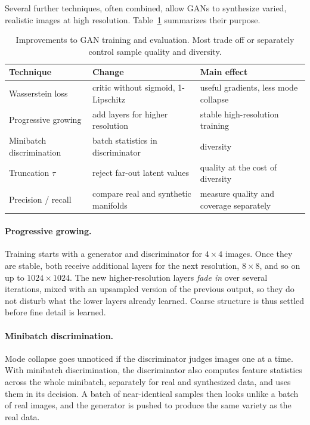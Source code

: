 Several further techniques, often combined, allow GANs to synthesize varied,
realistic images at high resolution.
Table~\ref{tab:gan-improvements} summarizes their purpose.

\begin{table}[ht]
  \centering
  \begin{tabular}{@{}p{4.0cm}p{5.0cm}p{5.0cm}@{}}
    \toprule
    Technique & Change & Main effect \\
    \midrule
    Wasserstein loss & critic without sigmoid, 1-Lipschitz & useful gradients,
      less mode collapse \\
    Progressive growing & add layers for higher resolution & stable
      high-resolution training \\
    Minibatch discrimination & batch statistics in discriminator & diversity \\
    Truncation $\tau$ & reject far-out latent values & quality at the cost of
      diversity \\
    Precision / recall & compare real and synthetic manifolds & measure
      quality and coverage separately \\
    \bottomrule
  \end{tabular}
  \caption{Improvements to GAN training and evaluation. Most trade off or
  separately control sample quality and diversity.}
  \label{tab:gan-improvements}
\end{table}

\paragraph{Progressive growing.}
Training starts with a generator and discriminator for $4\times4$ images.
Once they are stable, both receive additional layers for the next resolution,
$8\times8$, and so on up to $1024\times1024$. The new higher-resolution layers
\emph{fade in} over several iterations, mixed with an upsampled version of the
previous output, so they do not disturb what the lower layers already learned.
Coarse structure is thus settled before fine detail is learned.

\paragraph{Minibatch discrimination.}
Mode collapse goes unnoticed if the discriminator judges images one at a time.
With minibatch discrimination, the discriminator also computes feature
statistics across the whole minibatch, separately for real and synthesized
data, and uses them in its decision. A batch of near-identical samples then
looks unlike a batch of real images, and the generator is pushed to produce
the same variety as the real data.

